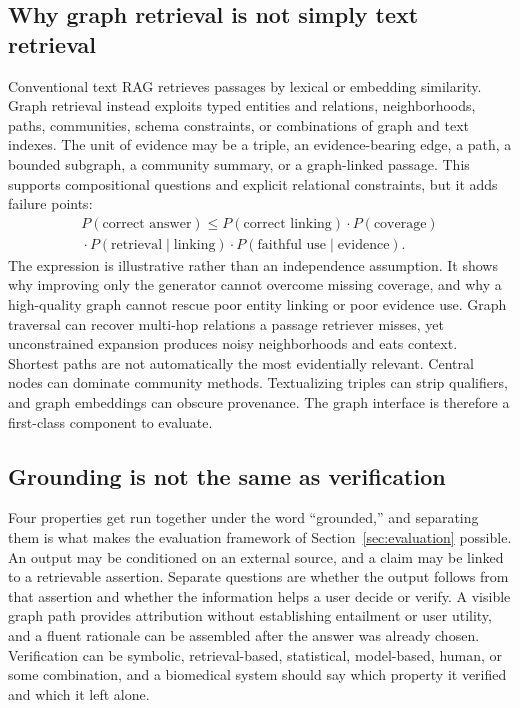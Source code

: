 \subsection{Why graph retrieval is not simply text retrieval}

Conventional text RAG retrieves passages by lexical or embedding similarity. Graph retrieval instead exploits typed entities and relations, neighborhoods, paths, communities, schema constraints, or combinations of graph and text indexes. The unit of evidence may be a triple, an evidence-bearing edge, a path, a bounded subgraph, a community summary, or a graph-linked passage. This supports compositional questions and explicit relational constraints, but it adds failure points:
\begin{multline}
P(\text{correct answer}) \leq P(\text{correct linking}) \cdot P(\text{coverage}) \\
{}\cdot P(\text{retrieval} \mid \text{linking}) \cdot P(\text{faithful use} \mid \text{evidence}).
\end{multline}
The expression is illustrative rather than an independence assumption. It shows why improving only the generator cannot overcome missing coverage, and why a high-quality graph cannot rescue poor entity linking or poor evidence use. Graph traversal can recover multi-hop relations a passage retriever misses, yet unconstrained expansion produces noisy neighborhoods and eats context. Shortest paths are not automatically the most evidentially relevant. Central nodes can dominate community methods. Textualizing triples can strip qualifiers, and graph embeddings can obscure provenance. The graph interface is therefore a first-class component to evaluate.

\subsection{Grounding is not the same as verification}

Four properties get run together under the word ``grounded,'' and separating them is what makes the evaluation framework of Section~\ref{sec:evaluation} possible. An output may be conditioned on an external source, and a claim may be linked to a retrievable assertion. Separate questions are whether the output follows from that assertion and whether the information helps a user decide or verify. A visible graph path provides attribution without establishing entailment or user utility, and a fluent rationale can be assembled after the answer was already chosen. Verification can be symbolic, retrieval-based, statistical, model-based, human, or some combination, and a biomedical system should say which property it verified and which it left alone.

